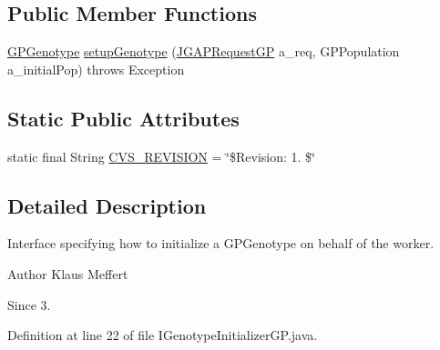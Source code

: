 \subsection*{Public Member Functions}
\begin{DoxyCompactItemize}
\item 
\hyperlink{classorg_1_1jgap_1_1gp_1_1impl_1_1_g_p_genotype}{G\-P\-Genotype} \hyperlink{interfaceorg_1_1jgap_1_1distr_1_1grid_1_1gp_1_1_i_genotype_initializer_g_p_adf8385b3bbdb190eb6d2ccd35b947aad}{setup\-Genotype} (\hyperlink{classorg_1_1jgap_1_1distr_1_1grid_1_1gp_1_1_j_g_a_p_request_g_p}{J\-G\-A\-P\-Request\-G\-P} a\-\_\-req, G\-P\-Population a\-\_\-initial\-Pop)  throws Exception
\end{DoxyCompactItemize}
\subsection*{Static Public Attributes}
\begin{DoxyCompactItemize}
\item 
static final String \hyperlink{interfaceorg_1_1jgap_1_1distr_1_1grid_1_1gp_1_1_i_genotype_initializer_g_p_a683bfae62e61ada9bff4d9fb7a01ee27}{C\-V\-S\-\_\-\-R\-E\-V\-I\-S\-I\-O\-N} = \char`\"{}\$Revision\-: 1. \$\char`\"{}
\end{DoxyCompactItemize}


\subsection{Detailed Description}
Interface specifying how to initialize a G\-P\-Genotype on behalf of the worker.

\begin{DoxyAuthor}{Author}
Klaus Meffert 
\end{DoxyAuthor}
\begin{DoxySince}{Since}
3. 
\end{DoxySince}


Definition at line 22 of file I\-Genotype\-Initializer\-G\-P.\-java.



